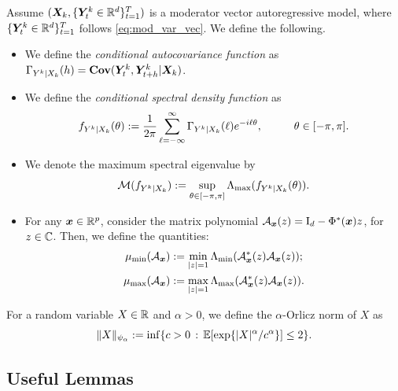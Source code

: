 \begin{definition}
    Assume $(\bm{X}_k, \{ \bm{Y}^k_{t}\in\mathbb{R}^{d} \}_{t=1}^T)$ is a moderator vector autoregressive model, where $\{ \bm{Y}^k_{t}\in\mathbb{R}^{d} \}_{t=1}^T$ follows \eqref{eq:mod_var_vec}. We define the following.
    \begin{itemize}
        \item We define the \textit{conditional autocovariance function} as $\Gamma_{Y^k|X_k}(h) = \textbf{Cov}(\bm{Y}^{k}_{t},  \bm{Y}^{k}_{t+ h}| \bm{X}_k)$.
        \item We define the \textit{conditional spectral density function} as $$ f_{Y^k | X_k} (\theta) := \frac{1}{2\pi} \sum_{\ell = -\infty}^\infty \Gamma_{Y^k | X_k } (\ell) e^{-i\ell \theta}, \hspace{10mm} \theta\in [-\pi , \pi]. $$
        \item We denote the maximum spectral eigenvalue by 
        $$ \mathcal{M}(f_{Y^k|X_k}) :=  \sup_{\theta\in[-\pi,\pi]} \Lambda_{\max} (f_{Y^k | X_k} (\theta)) .$$
        \item For any $\bm{x} \in\mathbb{R}^p$, consider the matrix polynomial $\mathcal{A}_{\bm{x}}(z) = \mathrm{I}_d - \Phi^*(\bm{x}) z $, for $z\in\mathbb{C}$. Then, we define the quantities:
        \begin{align}
            \mu_{\min}(\mathcal{A}_{\bm{x}})&:= \min_{|z| = 1} \Lambda_{\min} (\mathcal{A}_{\bm{x}}^*(z) \mathcal{A}_{\bm{x}}(z));\\
            \mu_{\max}(\mathcal{A}_{\bm{x}})&:= \max_{|z| = 1} \Lambda_{\max} (\mathcal{A}_{\bm{x}}^*(z) \mathcal{A}_{\bm{x}}(z)).
        \end{align}
    \end{itemize}
\end{definition}
    
\begin{definition}
    For a random variable $X\in\mathbb{R}$ and $\alpha > 0$, we define the $\alpha$-Orlicz norm  of $X$ as 
    \begin{equation*}
        \|X\|_{\psi_\alpha} := \inf\{ c > 0 \,:\, \mathbb{E}[\exp\{ |X|^\alpha/c^\alpha \}] \leq 2 \}.
    \end{equation*}
\end{definition}

\subsection{Useful Lemmas}




